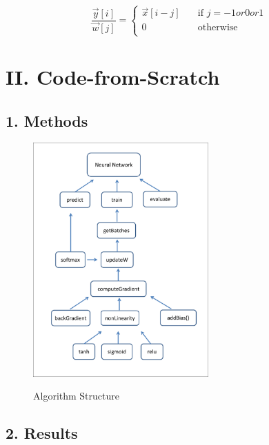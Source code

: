 \begin{description}
\begin{equation}
	\frac{\vec{y}[i]}{\vec{w}[j]} =
	\begin{cases}
			\vec{x}[i-j]	& 	\quad \text{if } j = -1 or 0 or 1 \\
			0				& 	\quad \text{otherwise} \\
		\end{cases}
\end{equation}
\end{description}

\newpage
\section*{\Large II. Code-from-Scratch}

\subsection*{\large 1. Methods}

\begin{figure}[H]
\centering
\includegraphics[width=0.6\textwidth]{./figures/ECE544hw2.pdf}\
\caption{\label{fig:structure} Algorithm Structure}
\end{figure}


\subsection*{\large 2. Results}

